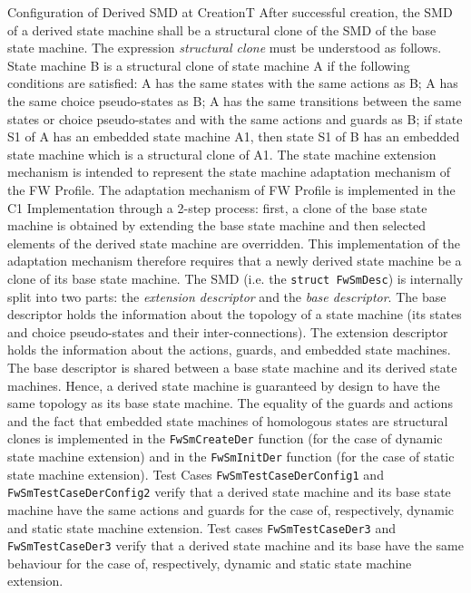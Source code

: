 \documentclass[a4paper,10pt]{article}
\newenvironment{fw_req_note}[7]
{\addtocounter{subsubsection}{1}
	\hspace{0.2cm}\textbf{FW-\arabic{section}.\arabic{subsection}.\arabic{subsubsection}/#2
	\hspace{0.8cm} #1}
	\vspace{-10pt}
\begin{longtable}{p{2.7cm}P{8.5cm}}
\hline
\textsc{Requirement} & #3 \\
\textsc{Note} & #4 \\
\textsc{Justification} & #5 \\
\textsc{Implementation} & #6  \\ 
\textsc{Verification} & #7  \\
\hline
}
{\end{longtable}}
\begin{document}
\begin{fw_req_note}{Configuration of Derived SMD at Creation}{T}
{After successful creation, the SMD of a derived state machine shall 
be a structural clone of the SMD of the base state machine.}
{The expression \emph{structural clone} must be understood as follows. 
State machine B is a structural clone of state machine A if the following conditions are 
satisfied: A has the same states with the same actions as B; A has the same choice 
pseudo-states as B; A has the same transitions between the same states or choice 
pseudo-states and with the same actions and guards as B; if state S1 of A has an embedded 
state machine A1, then state S1 of B has an embedded state machine which is a structural 
clone of A1.}
{The state machine extension mechanism is intended to represent 
the state machine adaptation mechanism of the FW Profile. 
The adaptation mechanism of FW Profile is implemented in the C1 Implementation through a 
2-step process: first, a clone of the base state machine is obtained by extending the 
base state machine and then selected elements of the derived state machine are overridden. 
This implementation of the adaptation mechanism therefore requires that a newly derived 
state machine be a clone of its base state machine.}
{The SMD (i.e. the \texttt{struct FwSmDesc}) is internally split 
into two parts: the \emph{extension descriptor} and the \emph{base descriptor}. 
The base descriptor holds the information about the topology of a state machine (its states 
and choice pseudo-states and their inter-connections). 
The extension descriptor holds the information about the actions, guards, and embedded 
state machines. 
The base descriptor is shared between a base state machine and its derived state machines. 
Hence, a derived state machine is guaranteed by design to have the same topology as its 
base state machine. 
The equality of the guards and actions and the fact that embedded state machines of 
homologous states are structural clones is implemented in the \texttt{FwSmCreateDer} 
function (for the case of dynamic state machine extension) and in the \texttt{FwSmInitDer} 
function (for the case of static state machine extension).} 
{Test Cases \texttt{FwSmTestCaseDerConfig1} and \texttt{FwSmTestCaseDerConfig2} verify that a derived state machine and its base state machine have the same actions and guards for the case of, respectively, dynamic and static state machine extension. Test cases \texttt{FwSmTestCaseDer3} and \texttt{FwSmTestCaseDer3} verify that a derived state machine and its base have the same behaviour for the case of, respectively, dynamic and static state machine extension.}
\end{fw_req_note}
\end{document}
